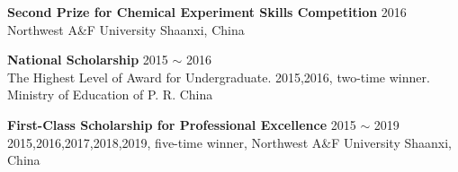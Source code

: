     






\vspace{4pt}

\textbf{Second Prize for Chemical Experiment Skills Competition} \hfill 2016 \\
{\small Northwest A\&F University \hfill Shaanxi, China}



\vspace{4pt}

\textbf{National Scholarship} \hfill 2015 $\sim$ 2016 \\
{\small The Highest Level of Award for Undergraduate. 2015,2016, two-time winner. \hfill Ministry of Education of P. R. China}\\


\vspace{4pt}

\textbf{First-Class Scholarship for Professional Excellence} \hfill 2015 $\sim$ 2019 \\
{\small 2015,2016,2017,2018,2019, five-time winner, Northwest A\&F University \hfill Shaanxi, China}


